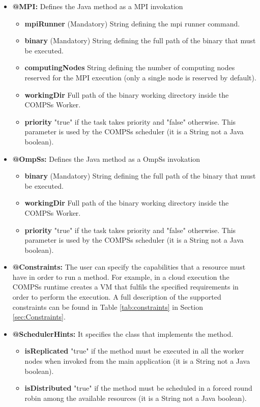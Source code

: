 \begin{itemize}
\begin{itemize}
	\item \textbf{@MPI:} Defines the Java method as a MPI invokation
	        \begin{itemize}
	        	\item \textbf{mpiRunner} (Mandatory) String defining the mpi runner command. 
		        \item \textbf{binary} (Mandatory) String defining the full path of the binary that must be executed.
		        \item \textbf{computingNodes} String defining the number of computing nodes reserved for the MPI execution
		        (only a single node is reserved by default).
			\item \textbf{workingDir} Full path of the binary working directory inside the COMPSs Worker.
			\item \textbf{priority} "true" if the task takes priority and "false" otherwise. This parameter is used
			by the COMPSs scheduler (it is a String not a Java boolean).
		\end{itemize}
		
	\item \textbf{@OmpSs:} Defines the Java method as a OmpSs invokation
	        \begin{itemize}
		        \item \textbf{binary} (Mandatory) String defining the full path of the binary that must be executed.
			\item \textbf{workingDir} Full path of the binary working directory inside the COMPSs Worker.
			\item \textbf{priority} "true" if the task takes priority and "false" otherwise. This parameter is used
			by the COMPSs scheduler (it is a String not a Java boolean).
		\end{itemize}

         \item \textbf{@Constraints:} The user can specify the capabilities that a resource must have in order
               to run a method. For example, in a cloud execution the COMPSs runtime creates a VM that fulfils the
               specified requirements in order to perform the execution. A full description of the supported constraints
               can be found in Table \ref{tab:constraints} in Section \ref{sec:Constraints}.
	 \item \textbf{@SchedulerHints:} It specifies the class that implements the method.
		\begin{itemize}
			\item \textbf{isReplicated} "true" if the method must be executed in all the worker nodes when invoked from 
			the main application (it is a String not a Java boolean).
			\item \textbf{isDistributed} "true" if the method must be scheduled in a forced round robin among the available
			resources (it is a String not a Java boolean).
		\end{itemize}
       \end{itemize}


\end{itemize}
